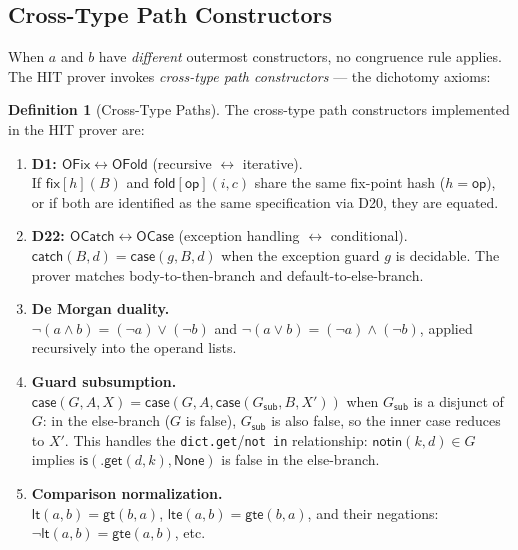 \documentclass[11pt,a4paper]{report}
\theoremstyle{definition}
\newtheorem{definition}{Definition}[chapter]
\theoremstyle{plain}
\newcommand{\fold}{\mathsf{fold}}
\begin{document}
\subsection{Cross-Type Path Constructors}
\label{sec:cross-type-paths}

When $a$ and $b$ have \emph{different} outermost constructors,
no congruence rule applies.  The HIT prover invokes
\emph{cross-type path constructors} --- the dichotomy axioms:

\begin{definition}[Cross-Type Paths]
\label{def:cross-type-paths}
The cross-type path constructors implemented in the HIT prover are:
\begin{enumerate}
  \item \textbf{D1: $\mathsf{OFix} \leftrightarrow \mathsf{OFold}$}
    (recursive $\leftrightarrow$ iterative).\\
    If $\mathsf{fix}[h](B)$ and $\fold[\mathsf{op}](i, c)$ share the
    same fix-point hash ($h = \mathsf{op}$), or if both are identified
    as the same specification via D20, they are equated.

  \item \textbf{D22: $\mathsf{OCatch} \leftrightarrow \mathsf{OCase}$}
    (exception handling $\leftrightarrow$ conditional).\\
    $\mathsf{catch}(B, d) = \mathsf{case}(g, B, d)$ when the exception
    guard $g$ is decidable.  The prover matches body-to-then-branch
    and default-to-else-branch.

  \item \textbf{De Morgan duality.}\\
    $\lnot(a \land b) = (\lnot a) \lor (\lnot b)$ and
    $\lnot(a \lor b) = (\lnot a) \land (\lnot b)$, applied
    recursively into the operand lists.

  \item \textbf{Guard subsumption.}\\
    $\mathsf{case}(G, A, X) = \mathsf{case}(G, A,
    \mathsf{case}(G_{\mathsf{sub}}, B, X'))$ when $G_{\mathsf{sub}}$
    is a disjunct of $G$: in the else-branch ($G$ is false),
    $G_{\mathsf{sub}}$ is also false, so the inner case reduces to $X'$.
    This handles the \texttt{dict.get}/\texttt{not in} relationship:
    $\mathsf{notin}(k,d) \in G$ implies
    $\mathsf{is}(\mathsf{.get}(d,k), \mathsf{None})$ is false in the
    else-branch.

  \item \textbf{Comparison normalization.}\\
    $\mathsf{lt}(a,b) = \mathsf{gt}(b,a)$, $\mathsf{lte}(a,b) =
    \mathsf{gte}(b,a)$, and their negations:
    $\lnot\mathsf{lt}(a,b) = \mathsf{gte}(a,b)$, etc.


\end{enumerate}
\end{definition}
\end{document}

